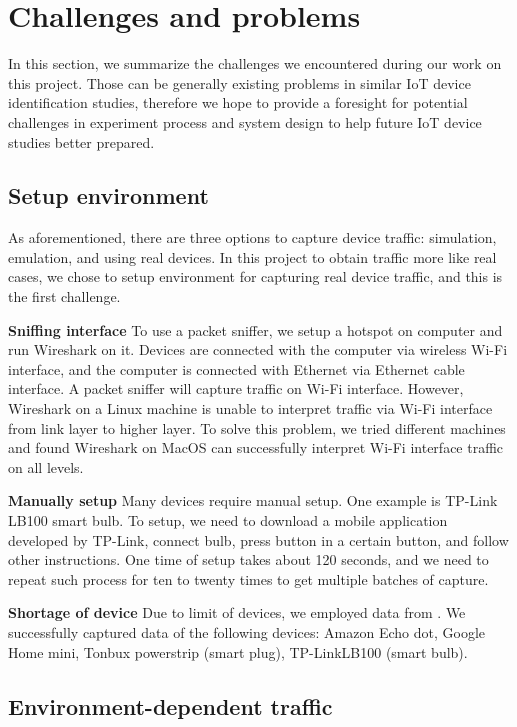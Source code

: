 \documentclass[twocolumn,10pt]{article}
\begin{document}
\section{Challenges and problems}
In this section, we summarize the challenges we encountered during our work on this project. Those can be generally existing problems in similar IoT device identification studies, therefore we hope to provide a foresight for potential challenges in experiment process and system design to help future IoT device studies better prepared.

\subsection{Setup environment}

As aforementioned, there are three options to capture device traffic: simulation, emulation, and using real devices. In this project to obtain traffic more like real cases, we chose to setup environment for capturing real device traffic, and this is the first challenge.

\textbf{Sniffing interface} To use a packet sniffer, we setup a hotspot on computer and run Wireshark on it. Devices are connected with the computer via wireless Wi-Fi interface, and the computer is connected with Ethernet via Ethernet cable interface. A packet sniffer will capture traffic on Wi-Fi interface. However, Wireshark on a Linux machine is unable to interpret traffic via Wi-Fi interface from link layer to higher layer. To solve this problem, we tried different machines and found Wireshark on MacOS can successfully interpret Wi-Fi interface traffic on all levels.

\textbf{Manually setup} Many devices require manual setup. One example is TP-Link LB100 smart bulb. To setup, we need to download a mobile application developed by TP-Link, connect bulb, press button in a certain button, and follow other instructions. One time of setup takes about 120 seconds, and we need to repeat such process for ten to twenty times to get multiple batches of capture.

\textbf{Shortage of device} Due to limit of devices, we employed data from \cite{miettinen2017iot}. We successfully captured data of the following devices: Amazon Echo dot, Google Home mini, Tonbux powerstrip (smart plug), TP-LinkLB100 (smart bulb).

\subsection{Environment-dependent traffic}
\end{document}

